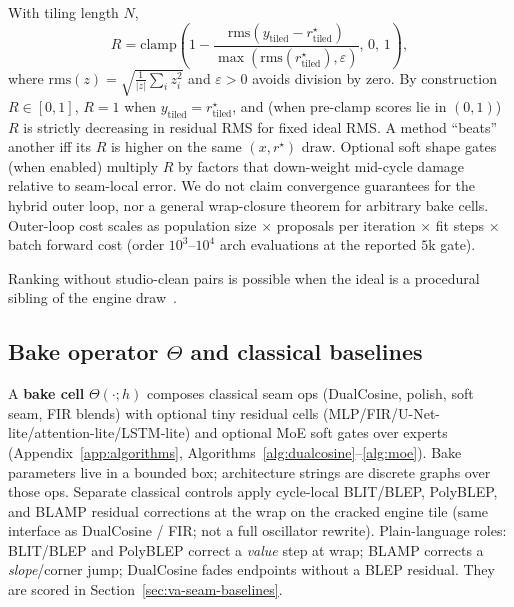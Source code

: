 With tiling length $N$,
\begin{equation}
\label{eq:R}
R=\mathrm{clamp}\!\left(1-\frac{\mathrm{rms}(y_{\mathrm{tiled}}-r^{\star}_{\mathrm{tiled}})}{\max(\mathrm{rms}(r^{\star}_{\mathrm{tiled}}),\varepsilon)},\,0,\,1\right),
\end{equation}
where $\mathrm{rms}(z)=\sqrt{\frac{1}{|z|}\sum_i z_i^2}$ and $\varepsilon>0$ avoids division by zero.
By construction $R\in[0,1]$, $R{=}1$ when $y_{\mathrm{tiled}}=r^{\star}_{\mathrm{tiled}}$, and (when pre-clamp scores lie in $(0,1)$) $R$ is strictly decreasing in residual RMS for fixed ideal RMS.
A method ``beats'' another iff its $R$ is higher on the same $(x,r^{\star})$ draw.
Optional soft shape gates (when enabled) multiply $R$ by factors that down-weight mid-cycle damage relative to seam-local error.
We do not claim convergence guarantees for the hybrid outer loop, nor a general wrap-closure theorem for arbitrary bake cells.
Outer-loop cost scales as population size $\times$ proposals per iteration $\times$ fit steps $\times$ batch forward cost (order $10^{3}$--$10^{4}$ arch evaluations at the reported $5$k gate).

\begin{remark}
\label{rem:n2n}
Ranking without studio-clean pairs is possible when the ideal is a procedural sibling of the engine draw~\cite{lehtinen2018,kashyap2021n2n}.
\end{remark}

\subsection{Bake operator $\Theta$ and classical baselines}
\label{sec:bake}

A \textbf{bake cell} $\Theta(\cdot;h)$ composes classical seam ops (DualCosine, polish, soft seam, FIR blends) with optional tiny residual cells (MLP/FIR/U-Net-lite/attention-lite/LSTM-lite) and optional MoE soft gates over experts (Appendix~\ref{app:algorithms}, Algorithms~\ref{alg:dualcosine}--\ref{alg:moe}).
Bake parameters live in a bounded box; architecture strings are discrete graphs over those ops.
Separate classical controls apply cycle-local BLIT/BLEP, PolyBLEP, and BLAMP residual corrections at the wrap on the cracked engine tile (same interface as DualCosine / FIR; not a full oscillator rewrite).
Plain-language roles: BLIT/BLEP and PolyBLEP correct a \emph{value} step at wrap; BLAMP corrects a \emph{slope}/corner jump; DualCosine fades endpoints without a BLEP residual.
They are scored in Section~\ref{sec:va-seam-baselines}.


